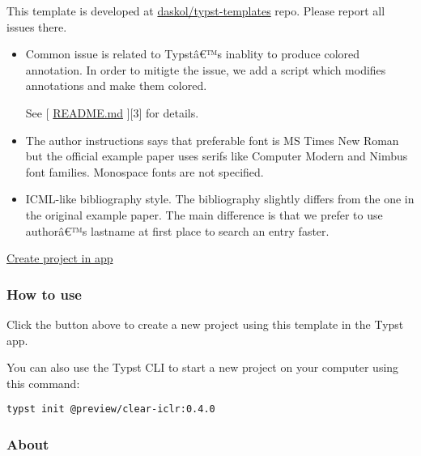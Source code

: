 This template is developed at
\href{https://github.com/daskol/typst-templates}{daskol/typst-templates}
repo. Please report all issues there.

\begin{itemize}
\item
  Common issue is related to Typstâ€™s inablity to produce colored
  annotation. In order to mitigte the issue, we add a script which
  modifies annotations and make them colored.

\begin{Shaded}
\begin{Highlighting}[]
\end{Highlighting}
\end{Shaded}

  See {[} \href{http://readme.md/}{README.md} {]}{[}3{]} for details.
\item
  The author instructions says that preferable font is MS Times New
  Roman but the official example paper uses serifs like Computer Modern
  and Nimbus font families. Monospace fonts are not specified.
\item
  ICML-like bibliography style. The bibliography slightly differs from
  the one in the original example paper. The main difference is that we
  prefer to use authorâ€™s lastname at first place to search an entry
  faster.
\end{itemize}

\href{/app?template=clear-iclr&version=0.4.0}{Create project in app}

\subsubsection{How to use}\label{how-to-use}

Click the button above to create a new project using this template in
the Typst app.

You can also use the Typst CLI to start a new project on your computer
using this command:

\begin{verbatim}
typst init @preview/clear-iclr:0.4.0
\end{verbatim}



\subsubsection{About}\label{about}

